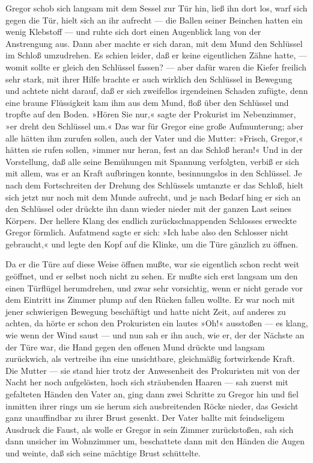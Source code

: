 Gregor schob sich langsam mit dem Sessel zur Tür hin, ließ ihn dort los,
warf sich gegen die Tür, hielt sich an ihr aufrecht --- die Ballen seiner
Beinchen hatten ein wenig Klebstoff --- und ruhte sich dort einen
Augenblick lang von der Anstrengung aus. Dann aber machte er sich daran,
mit dem Mund den Schlüssel im Schloß umzudrehen. Es schien leider, daß
er keine eigentlichen Zähne hatte, --- womit sollte er gleich den
Schlüssel fassen? --- aber dafür waren die Kiefer freilich sehr stark,
mit ihrer Hilfe brachte er auch wirklich den Schlüssel in Bewegung und
achtete nicht darauf, daß er sich zweifellos irgendeinen Schaden
zufügte, denn eine braune Flüssigkeit kam ihm aus dem Mund, floß über
den Schlüssel und tropfte auf den Boden. »Hören Sie nur,« sagte der
Prokurist im Nebenzimmer, »er dreht den Schlüssel um.« Das war für
Gregor eine große Aufmunterung; aber alle hätten ihm zurufen sollen,
auch der Vater und die Mutter: »Frisch, Gregor,« hätten sie rufen
sollen, »immer nur heran, fest an das Schloß heran!« Und in der
Vorstellung, daß alle seine Bemühungen mit Spannung verfolgten, verbiß
er sich mit allem, was er an Kraft aufbringen konnte, besinnungslos in
den Schlüssel. Je nach dem Fortschreiten der Drehung des Schlüssels
umtanzte er das Schloß, hielt sich jetzt nur noch mit dem Munde
aufrecht, und je nach Bedarf hing er sich an den Schlüssel oder drückte
ihn dann wieder nieder mit der ganzen Last seines Körpers. Der hellere
Klang des endlich zurückschnappenden Schlosses erweckte Gregor förmlich.
Aufatmend sagte er sich: »Ich habe also den Schlosser nicht gebraucht,«
und legte den Kopf auf die Klinke, um die Türe gänzlich zu öffnen.

Da er die Türe auf diese Weise öffnen mußte, war sie eigentlich schon
recht weit geöffnet, und er selbst noch nicht zu sehen. Er mußte sich
erst langsam um den einen Türflügel herumdrehen, und zwar sehr
vorsichtig, wenn er nicht gerade vor dem Eintritt ins Zimmer plump auf
den Rücken fallen wollte. Er war noch mit jener schwierigen Bewegung
beschäftigt und hatte nicht Zeit, auf anderes zu achten, da hörte er
schon den Prokuristen ein lautes »Oh!« ausstoßen --- es klang, wie wenn
der Wind saust --- und nun sah er ihn auch, wie er, der der Nächste an
der Türe war, die Hand gegen den offenen Mund drückte und langsam
zurückwich, als vertreibe ihn eine unsichtbare, gleichmäßig fortwirkende
Kraft. Die Mutter --- sie stand hier trotz der Anwesenheit des
Prokuristen mit von der Nacht her noch aufgelösten, hoch sich
sträubenden Haaren --- sah zuerst mit gefalteten Händen den Vater an,
ging dann zwei Schritte zu Gregor hin und fiel inmitten ihrer rings um
sie herum sich ausbreitenden Röcke nieder, das Gesicht ganz unauffindbar
zu ihrer Brust gesenkt. Der Vater ballte mit feindseligem Ausdruck die
Faust, als wolle er Gregor in sein Zimmer zurückstoßen, sah sich dann
unsicher im Wohnzimmer um, beschattete dann mit den Händen die Augen und
weinte, daß sich seine mächtige Brust schüttelte.

